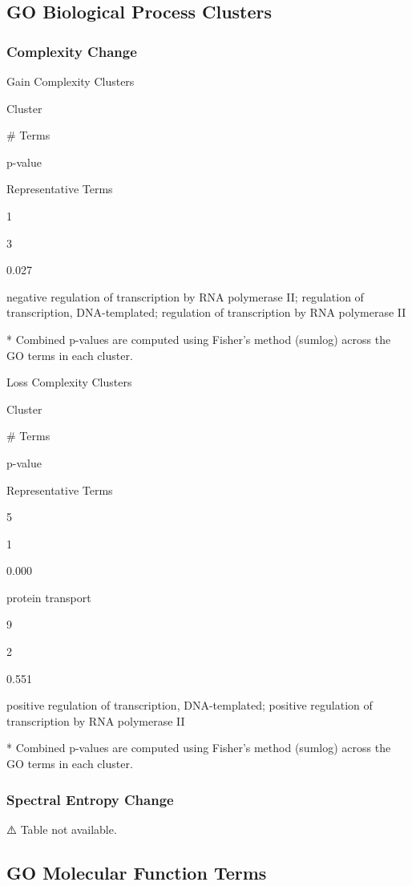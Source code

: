 \documentclass[
  letterpaper,
  DIV=11,
  numbers=noendperiod,
  openany,
  oneside]{scrreprt}
\begin{document}
\subsection{GO Biological Process Clusters}

\subsubsection{Complexity Change}

Gain Complexity Clusters

Cluster

\# Terms

p-value

Representative Terms

1

3

0.027

negative regulation of transcription by RNA polymerase II; regulation of
transcription, DNA-templated; regulation of transcription by RNA
polymerase II

* Combined p-values are computed using Fisher's method (sumlog) across
the GO terms in each cluster.

Loss Complexity Clusters

Cluster

\# Terms

p-value

Representative Terms

5

1

0.000

protein transport

9

2

0.551

positive regulation of transcription, DNA-templated; positive regulation
of transcription by RNA polymerase II

* Combined p-values are computed using Fisher's method (sumlog) across
the GO terms in each cluster.

\subsubsection{Spectral Entropy Change}

⚠️ Table not available.

\subsection{GO Molecular Function Terms}
\end{document}
